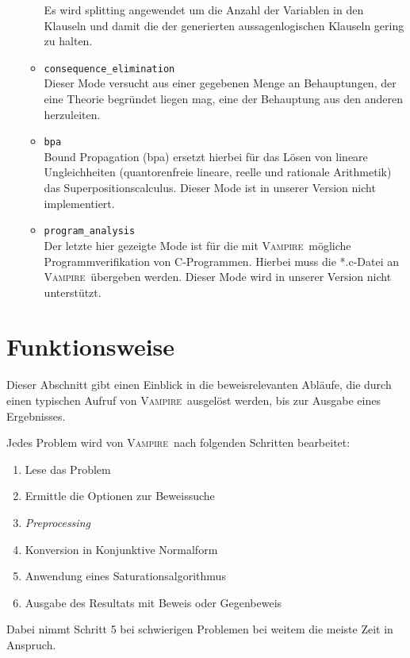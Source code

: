 \documentclass{article}
\newcommand{\vampire}{\textsc{Vampire}~}
\begin{document}
\begin{itemize}
\begin{itemize}
	Es wird splitting angewendet um die Anzahl der Variablen in den Klauseln und damit die der generierten aussagenlogischen Klauseln gering zu halten.
	\item \verb|consequence_elimination| \\
	Dieser Mode versucht aus einer gegebenen Menge an Behauptungen, der eine Theorie begründet liegen mag, eine der Behauptung aus den anderen herzuleiten.
	\item \verb|bpa| \\
	Bound Propagation (bpa) ersetzt hierbei für das Lösen von lineare Ungleichheiten (quantorenfreie lineare, reelle und rationale Arithmetik) das Superpositionscalculus.
	Dieser Mode ist in unserer Version nicht implementiert.
	\item \verb|program_analysis| \\
	Der letzte hier gezeigte Mode ist für die mit \vampire mögliche Programmverifikation von C-Programmen. Hierbei muss die *.c-Datei an \vampire übergeben werden.
	Dieser Mode wird in unserer Version nicht unterstützt.
\end{itemize}
\end{itemize} %



\section{Funktionsweise}
\label{sec:mechanics}

Dieser Abschnitt gibt einen Einblick in die beweisrelevanten Abläufe, die durch einen typischen Aufruf von \vampire ausgelöst werden, bis zur Ausgabe eines Ergebnisses.

Jedes Problem wird von \vampire nach folgenden Schritten bearbeitet: \cite[S. 9]{cav2013}

\begin{enumerate}
	\itemsep-0.3em 
	\item Lese das Problem
	\item Ermittle die Optionen zur Beweissuche
	\item \emph{Preprocessing}
	\item Konversion in Konjunktive Normalform
	\item Anwendung eines Saturationsalgorithmus
	\item Ausgabe des Resultats mit Beweis oder Gegenbeweis
\end{enumerate}
Dabei nimmt Schritt 5 bei schwierigen Problemen bei weitem die meiste Zeit in Anspruch.
\end{document}
